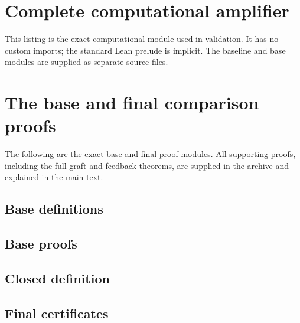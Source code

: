 \documentclass[11pt,letterpaper]{article}
\theoremstyle{definition}
\begin{document}
\section{Complete computational amplifier}

This listing is the exact computational module used in validation. It has no
custom imports; the standard Lean prelude is implicit. The baseline and base
modules are supplied as separate source files.

\section{The base and final comparison proofs}

The following are the exact base and final proof modules. All supporting
proofs, including the full graft and feedback theorems, are supplied in the
archive and explained in the main text.
\subsection{Base definitions}
\subsection{Base proofs}
\subsection{Closed definition}
\subsection{Final certificates}
\end{document}
